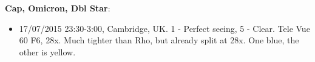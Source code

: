 {\bf Cap, Omicron, Dbl Star}:
\begin{itemize}
\item 17/07/2015 23:30-3:00, Cambridge, UK. 1 - Perfect seeing, 5 - Clear. Tele Vue 60 F6, 28x. Much tighter than Rho, but already split at 28x. One blue, the other is yellow.
\end{itemize}

